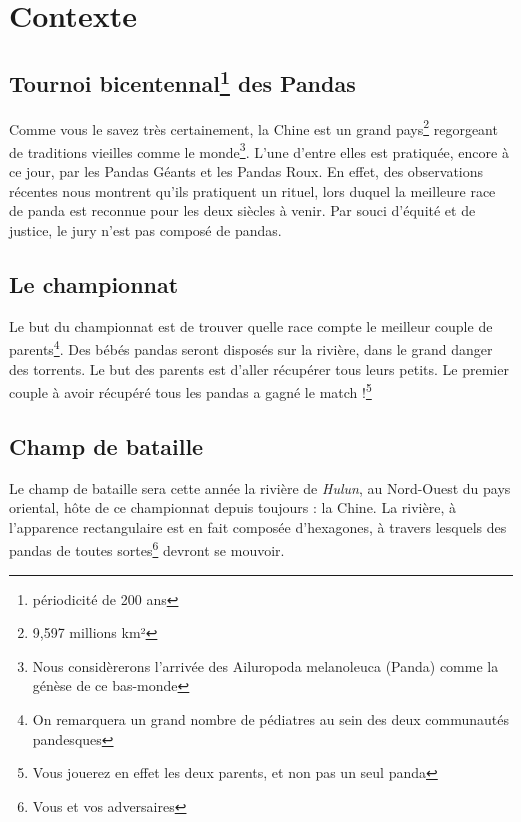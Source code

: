 \section{Contexte} %


\subsection{Tournoi bicentennal\protect\footnote{périodicité de 200 ans} des Pandas} %


Comme vous le savez très certainement, la Chine est un grand pays\footnote{9,597 millions km²} regorgeant de traditions vieilles comme le monde\footnote{Nous considèrerons l'arrivée des Ailuropoda melanoleuca (Panda) comme la génèse de ce bas-monde}. L'une d'entre elles est pratiquée, encore à ce jour, par les Pandas Géants et les Pandas Roux. En effet, des observations récentes nous montrent qu'ils pratiquent un rituel, lors duquel la meilleure race de panda est reconnue pour les deux siècles à venir. Par souci d'équité et de justice, le jury n'est pas composé de pandas.

\subsection{Le championnat}
Le but du championnat est de trouver quelle race compte le meilleur couple de parents\footnote{On remarquera un grand nombre de pédiatres au sein des deux communautés pandesques}. Des bébés pandas seront disposés sur la rivière, dans le grand danger des torrents. Le but des parents est d'aller récupérer tous leurs petits. Le premier couple à avoir récupéré tous les pandas a gagné le match !\footnote{Vous jouerez en effet les deux parents, et non pas un seul panda}

\subsection{Champ de bataille}
Le champ de bataille sera cette année la rivière de \textit{Hulun}, au Nord-Ouest du pays oriental, hôte de ce championnat depuis toujours : la Chine. La rivière, à l'apparence rectangulaire est en fait composée d'hexagones, à travers lesquels des pandas de toutes sortes\footnote{Vous et vos adversaires} devront se mouvoir.

